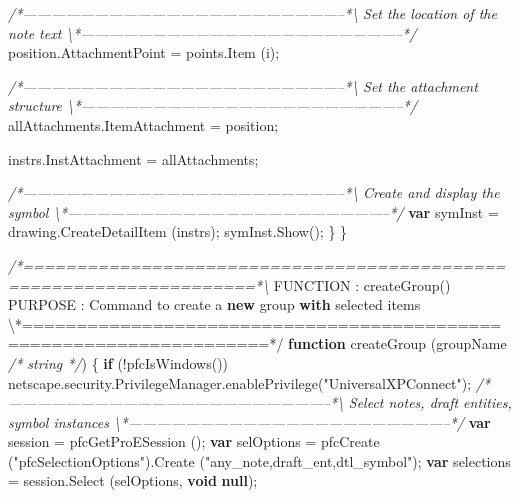 \documentclass[]{article}
\newenvironment{Shaded}{}{}
\newcommand{\KeywordTok}[1]{\textcolor[rgb]{0.00,0.44,0.13}{\textbf{{#1}}}}
\newcommand{\StringTok}[1]{\textcolor[rgb]{0.25,0.44,0.63}{{#1}}}
\newcommand{\CommentTok}[1]{\textcolor[rgb]{0.38,0.63,0.69}{\textit{{#1}}}}
\newcommand{\OtherTok}[1]{\textcolor[rgb]{0.00,0.44,0.13}{{#1}}}
\newcommand{\FunctionTok}[1]{\textcolor[rgb]{0.02,0.16,0.49}{{#1}}}
\newcommand{\NormalTok}[1]{{#1}}
\begin{document}
\begin{Shaded}
\begin{Highlighting}[]
\CommentTok{/*--------------------------------------------------------------------*\textbackslash{}    }
\CommentTok{  Set the location of the note text }
\CommentTok{\textbackslash{}*--------------------------------------------------------------------*/} 
      \OtherTok{position}\NormalTok{.}\FunctionTok{AttachmentPoint} \NormalTok{= }\OtherTok{points}\NormalTok{.}\FunctionTok{Item} \NormalTok{(i);}
      
\CommentTok{/*--------------------------------------------------------------------*\textbackslash{}    }
\CommentTok{  Set the attachment structure}
\CommentTok{\textbackslash{}*--------------------------------------------------------------------*/} 
      \OtherTok{allAttachments}\NormalTok{.}\FunctionTok{ItemAttachment} \NormalTok{= position;}
      
      \OtherTok{instrs}\NormalTok{.}\FunctionTok{InstAttachment} \NormalTok{= allAttachments;}

\CommentTok{/*--------------------------------------------------------------------*\textbackslash{}    }
\CommentTok{  Create and display the symbol }
\CommentTok{\textbackslash{}*--------------------------------------------------------------------*/}  
      \KeywordTok{var} \NormalTok{symInst = }\OtherTok{drawing}\NormalTok{.}\FunctionTok{CreateDetailItem} \NormalTok{(instrs);}
      \OtherTok{symInst}\NormalTok{.}\FunctionTok{Show}\NormalTok{();}
    \NormalTok{\}   }
\NormalTok{\}}
 
 
\CommentTok{/*====================================================================*\textbackslash{}}
 \NormalTok{FUNCTION : }\FunctionTok{createGroup}\NormalTok{() }
 \NormalTok{PURPOSE  : Command to create a }\KeywordTok{new} \NormalTok{group }\KeywordTok{with} \NormalTok{selected items }
\NormalTok{\textbackslash{}*====================================================================*}\OtherTok{/}
\KeywordTok{function} \FunctionTok{createGroup} \NormalTok{(groupName }\CommentTok{/* string */}\NormalTok{)}
\NormalTok{\{ }
  \KeywordTok{if} \NormalTok{(!}\FunctionTok{pfcIsWindows}\NormalTok{())}
    \OtherTok{netscape}\NormalTok{.}\OtherTok{security}\NormalTok{.}\OtherTok{PrivilegeManager}\NormalTok{.}\FunctionTok{enablePrivilege}\NormalTok{(}\StringTok{"UniversalXPConnect"}\NormalTok{);    }
\CommentTok{/*--------------------------------------------------------------------*\textbackslash{}    }
\CommentTok{  Select notes, draft entities, symbol instances }
\CommentTok{\textbackslash{}*--------------------------------------------------------------------*/}     
  \KeywordTok{var} \NormalTok{session = }\FunctionTok{pfcGetProESession} \NormalTok{();}
  \KeywordTok{var} \NormalTok{selOptions = }
    \FunctionTok{pfcCreate} \NormalTok{(}\StringTok{"pfcSelectionOptions"}\NormalTok{).}\FunctionTok{Create} \NormalTok{(}\StringTok{"any_note,draft_ent,dtl_symbol"}\NormalTok{);}
  \KeywordTok{var} \NormalTok{selections = }\OtherTok{session}\NormalTok{.}\FunctionTok{Select} \NormalTok{(selOptions, }\KeywordTok{void} \KeywordTok{null}\NormalTok{);}
  

\end{Highlighting}
\end{Shaded}
\end{document}
